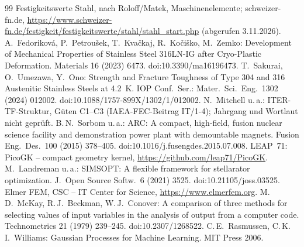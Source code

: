 \documentclass[10pt,a4paper]{article}
\begin{document}
\begin{thebibliography}{99}\small
{} Festigkeitswerte Stahl, nach Roloff/Matek, Maschinenelemente; schweizer-fn.de,
  \url{https://www.schweizer-fn.de/festigkeit/festigkeitswerte/stahl/stahl_start.php} (abgerufen 3.11.2026).
 A.~Fedoriková, P.~Petroušek, T.~Kvačkaj, R.~Kočiško, M.~Zemko: Development of Mechanical
  Properties of Stainless Steel 316LN-IG after Cryo-Plastic Deformation. Materials 16 (2023) 6473.
  doi:10.3390/ma16196473.
 T.~Sakurai, O.~Umezawa, Y.~Ono: Strength and Fracture Toughness of Type 304 and 316 Austenitic
  Stainless Steels at 4.2~K. IOP Conf.\ Ser.: Mater.\ Sci.\ Eng.\ 1302 (2024) 012002.
  doi:10.1088/1757-899X/1302/1/012002.
 N.~Mitchell u.\,a.: ITER-TF-Struktur, Güten C1--C3 (IAEA-FEC-Beitrag IT/1-4); Jahrgang und
  Wortlaut nicht geprüft.
 B.\,N.~Sorbom u.\,a.: ARC: A compact, high-field, fusion nuclear science facility and demonstration
  power plant with demountable magnets. Fusion Eng.\ Des.\ 100 (2015) 378--405. doi:10.1016/j.fusengdes.2015.07.008.
 LEAP~71: PicoGK -- compact geometry kernel, \url{https://github.com/leap71/PicoGK}.
 M.~Landreman u.\,a.: SIMSOPT: A flexible framework for stellarator optimization. J.\ Open Source
  Softw.\ 6 (2021) 3525. doi:10.21105/joss.03525.
 Elmer FEM, CSC -- IT Center for Science, \url{https://www.elmerfem.org}.
 M.\,D.~McKay, R.\,J.~Beckman, W.\,J.~Conover: A comparison of three methods for selecting values
  of input variables in the analysis of output from a computer code. Technometrics 21 (1979) 239--245.
  doi:10.2307/1268522.
 C.\,E.~Rasmussen, C.\,K.\,I.~Williams: Gaussian Processes for Machine Learning. MIT Press 2006.
\end{thebibliography}
\end{document}
